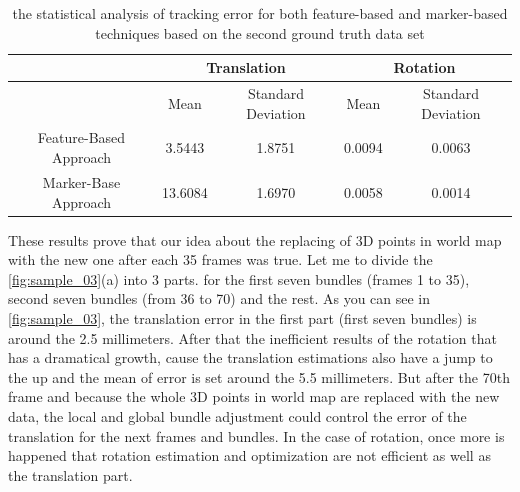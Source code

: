 \begin{table}[H]
\centering
  \begin{tabular}{| c || c | c | c | c |}
      \hline
      & \multicolumn{2}{c|}{Translation} & \multicolumn{2}{c|}{Rotation} \\ \hline
       & Mean & Standard Deviation & Mean & Standard Deviation \\ \hline
      Feature-Based Approach & 3.5443 & 1.8751 & 0.0094 & 0.0063 \\ \hline
      Marker-Base Approach & 13.6084 & 1.6970 & 0.0058 & 0.0014 \\ \hline
  \end{tabular}
  \caption{the statistical analysis of tracking error for both feature-based and marker-based techniques based on the second ground truth data set} \label{tab:sample_03}
\end{table}

These results prove that our idea about the replacing of 3D points in world map with the new one after each 35 frames was true. Let me to divide the \autoref{fig:sample_03}(a) into 3 parts. for the first seven bundles (frames 1 to 35), second seven bundles (from 36 to 70) and the rest. As you can see in \autoref{fig:sample_03}, the translation error in the first part (first seven bundles) is around the 2.5 millimeters. After that the inefficient results of the rotation that has a dramatical growth, cause the translation estimations also have a jump to the up and the mean of error is set around the 5.5 millimeters. But after the 70th frame and because the whole 3D points in world map are replaced with the new data, the local and global bundle adjustment could control the error of the translation for the next frames and bundles. In the case of rotation, once more is happened that rotation estimation and optimization are not efficient as well as the translation part.

